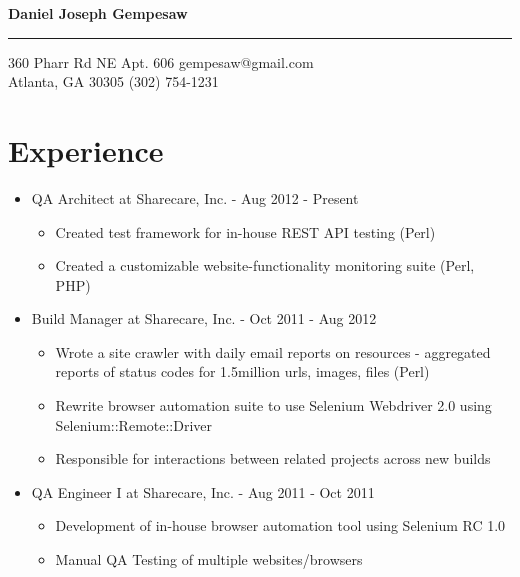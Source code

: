\documentclass[10pt]{article}
\newenvironment{myitem}{
\begin{itemize}
  \setlength{\itemsep}{1pt}
  \setlength{\parskip}{0pt}
  \setlength{\parsep}{0pt}
}{\end{itemize}}
\begin{document}
\begin{center} 
\Large 
\textbf{Daniel Joseph Gempesaw} 
\end{center} 
\hrule 
\vspace{0.2 cm}
\normalsize
360 Pharr Rd NE Apt. 606 \hfill gempesaw@gmail.com\\
Atlanta, GA 30305 \hfill (302) 754-1231\\
\vspace{-.60 cm}

\vspace{-0.45 cm}
\section{Experience}
\vspace{-0.25cm}

\begin{myitem}
  \item QA Architect at Sharecare, Inc. - \hfill Aug 2012 - Present
  \begin{myitem}
    \item Created test framework for in-house REST API testing (Perl)
    \item Created a customizable website-functionality monitoring suite (Perl, PHP) 
  \end{myitem}

  \item Build Manager at Sharecare, Inc. - \hfill Oct 2011 - Aug 2012
  \begin{myitem}
    \item Wrote a site crawler with daily email reports on resources - aggregated reports of status codes for 1.5million urls, images, files (Perl)
    \item Rewrite browser automation suite to use Selenium Webdriver 2.0 using Selenium::Remote::Driver
    \item Responsible for interactions between related projects across new builds
  \end{myitem}

  \item QA Engineer I at Sharecare, Inc. - \hfill Aug 2011 - Oct 2011
  \begin{myitem}
    \item Development of in-house browser automation tool using Selenium RC 1.0
    \item Manual QA Testing of multiple websites/browsers
  \end{myitem}
\end{myitem}
\end{document}
